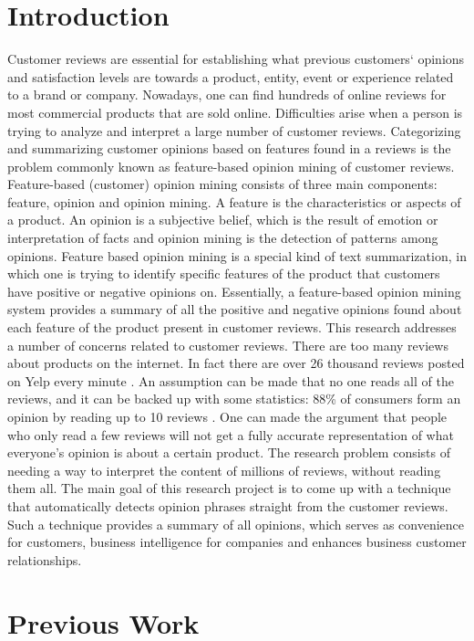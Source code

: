 \documentclass{sig-alternate}
\begin{document}
\section{Introduction}
Customer reviews are essential for establishing what previous customers` opinions and satisfaction levels are towards a product, entity, event or experience related to a brand or company. Nowadays, one can find hundreds of online reviews for most commercial products that are sold online. Difficulties arise when a person is trying to analyze and interpret a large number of customer reviews. Categorizing and summarizing customer opinions based on features found in a reviews is the problem commonly known as feature-based opinion mining of customer reviews. 
Feature-based (customer) opinion mining consists of three main components: feature, opinion and opinion mining. A feature is the characteristics or aspects of a product. An opinion is a subjective belief, which is the result of emotion or interpretation of facts and opinion mining is the detection of patterns among opinions. Feature based opinion mining is a special kind of text summarization, in which one is trying to identify specific features of the product that customers have positive or negative opinions on. Essentially, a feature-based opinion mining system provides a summary of all the positive and negative opinions found about each feature of the product present in customer reviews.
This research addresses a number of concerns related to customer reviews. There are too many reviews about products on the internet. In fact there are over 26 thousand reviews posted on Yelp every minute \cite{Shrestha2016}. An assumption can be made that no one reads all of the reviews, and it can be  backed up with some statistics: 88\% of consumers form an opinion by reading up to 10 reviews \cite{Shrestha2016}. One can made the argument that people who only read a few reviews will not get a fully accurate representation of what everyone's opinion is about a certain product. The research problem consists of needing a way to interpret the content of millions of reviews, without reading them all. The main goal of this research project is to come up with a technique that automatically detects opinion phrases straight from the customer reviews. Such a technique provides a summary of all opinions, which serves as convenience for customers, business intelligence for companies and enhances business customer relationships.

\section{Previous Work}
\end{document}
